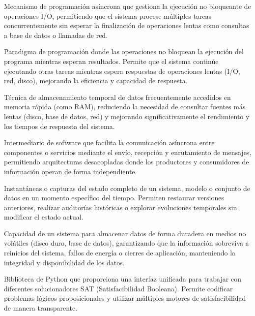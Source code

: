 \begin{description}[style=nextline,leftmargin=0pt]
    \item[Event Loop]
    Mecanismo de programación asíncrona que gestiona la ejecución no bloqueante de operaciones I/O, permitiendo que el sistema procese múltiples tareas concurrentemente sin esperar la finalización de operaciones lentas como consultas a base de datos o llamadas de red.
    
    \item[Asincronía]
    Paradigma de programación donde las operaciones no bloquean la ejecución del programa mientras esperan resultados. Permite que el sistema continúe ejecutando otras tareas mientras espera respuestas de operaciones lentas (I/O, red, disco), mejorando la eficiencia y capacidad de respuesta.
    
    \item[Cache/Caching]
    Técnica de almacenamiento temporal de datos frecuentemente accedidos en memoria rápida (como RAM), reduciendo la necesidad de consultar fuentes más lentas (disco, base de datos, red) y mejorando significativamente el rendimiento y los tiempos de respuesta del sistema.
    
    \item[Message Broker]
    Intermediario de software que facilita la comunicación asíncrona entre componentes o servicios mediante el envío, recepción y enrutamiento de mensajes, permitiendo arquitecturas desacopladas donde los productores y consumidores de información operan de forma independiente.
    
    \item[Snapshots]
    Instantáneas o capturas del estado completo de un sistema, modelo o conjunto de datos en un momento específico del tiempo. Permiten restaurar versiones anteriores, realizar auditorías históricas o explorar evoluciones temporales sin modificar el estado actual.
    
    \item[Persistencia]
    Capacidad de un sistema para almacenar datos de forma duradera en medios no volátiles (disco duro, base de datos), garantizando que la información sobreviva a reinicios del sistema, fallos de energía o cierres de aplicación, manteniendo la integridad y disponibilidad de los datos.
    
    \item[PySAT]
    Biblioteca de Python que proporciona una interfaz unificada para trabajar con diferentes solucionadores SAT (Satisfacibilidad Booleana). Permite codificar problemas lógicos proposicionales y utilizar múltiples motores de satisfacibilidad de manera transparente.
    

\end{description}
